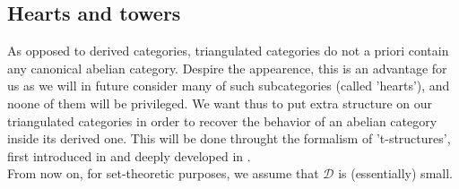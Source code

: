 %
%
%
\newpage 

\subsection{Hearts and towers} 
As opposed to derived categories, triangulated categories do not a priori contain any canonical abelian category. Despire the appearence, this is an advantage for us as we will in future consider many of such subcategories (called 'hearts'), and noone of them will be privileged. We want thus to put extra structure on our triangulated categories in order to recover the behavior of an abelian category inside its derived one. This will be done throught the formalism of 't-structures', first introduced in \cite{del} and deeply developed in \cite{gel}. \\
From now on, for set-theoretic purposes, we assume that $\mathscr{D}$ is (essentially) small. \\

